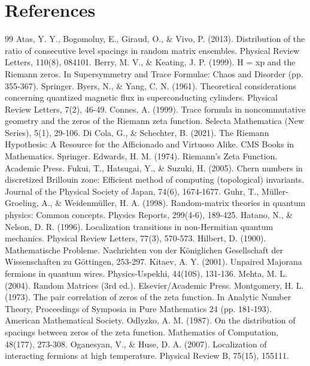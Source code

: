\documentclass[10pt]{article}
\begin{document}
\part*{References}
\begin{thebibliography}{99}\small
{} Atas, Y. Y., Bogomolny, E., Giraud, O., \& Vivo, P. (2013). Distribution of the ratio of consecutive level spacings in random matrix ensembles. Physical Review Letters, 110(8), 084101.
 Berry, M. V., \& Keating, J. P. (1999). H = xp and the Riemann zeros. In Supersymmetry and Trace Formulae: Chaos and Disorder (pp. 355-367). Springer.
 Byers, N., \& Yang, C. N. (1961). Theoretical considerations concerning quantized magnetic flux in superconducting cylinders. Physical Review Letters, 7(2), 46-49.
 Connes, A. (1999). Trace formula in noncommutative geometry and the zeros of the Riemann zeta function. Selecta Mathematica (New Series), 5(1), 29-106.
 Di Cola, G., \& Schechter, B. (2021). The Riemann Hypothesis: A Resource for the Afficionado and Virtuoso Alike. CMS Books in Mathematics. Springer.
 Edwards, H. M. (1974). Riemann's Zeta Function. Academic Press.
 Fukui, T., Hatsugai, Y., \& Suzuki, H. (2005). Chern numbers in discretized Brillouin zone: Efficient method of computing (topological) invariants. Journal of the Physical Society of Japan, 74(6), 1674-1677.
 Guhr, T., Müller-Groeling, A., \& Weidenmüller, H. A. (1998). Random-matrix theories in quantum physics: Common concepts. Physics Reports, 299(4-6), 189-425.
 Hatano, N., \& Nelson, D. R. (1996). Localization transitions in non-Hermitian quantum mechanics. Physical Review Letters, 77(3), 570-573.
 Hilbert, D. (1900). Mathematische Probleme. Nachrichten von der Königlichen Gesellschaft der Wissenschaften zu Göttingen, 253-297.
 Kitaev, A. Y. (2001). Unpaired Majorana fermions in quantum wires. Physics-Uspekhi, 44(10S), 131-136.
 Mehta, M. L. (2004). Random Matrices (3rd ed.). Elsevier/Academic Press.
 Montgomery, H. L. (1973). The pair correlation of zeros of the zeta function. In Analytic Number Theory, Proceedings of Symposia in Pure Mathematics 24 (pp. 181-193). American Mathematical Society.
 Odlyzko, A. M. (1987). On the distribution of spacings between zeros of the zeta function. Mathematics of Computation, 48(177), 273-308.
 Oganesyan, V., \& Huse, D. A. (2007). Localization of interacting fermions at high temperature. Physical Review B, 75(15), 155111.

\end{thebibliography}
\end{document}
